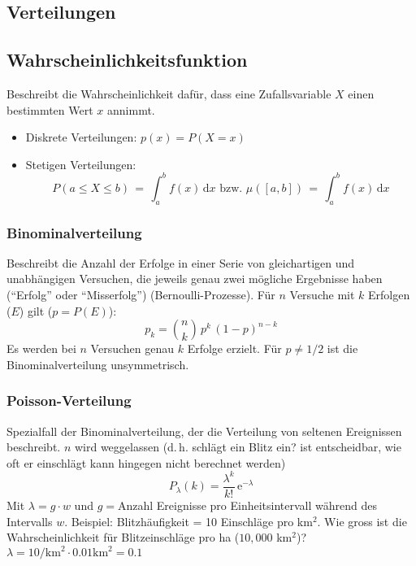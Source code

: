 \subsection{Verteilungen}

\subsection{Wahrscheinlichkeitsfunktion}
Beschreibt die Wahrscheinlichkeit dafür, dass eine Zufallsvariable $X$ einen bestimmten Wert $x$ annimmt.
\begin{itemize}\itemsep0em
	\item Diskrete Verteilungen: $p(x) = P(X = x)$
	\item Stetigen Verteilungen: 
	\begin{equation*}
	P(a \le X \le b) \, = \, \int_a^b f(x)\,\mathrm dx \mbox{ bzw. } \mu([a,b]) \, = \, \int_a^b f(x)\,\mathrm dx	
	\end{equation*}
\end{itemize}


\subsubsection{Binominalverteilung}
Beschreibt die Anzahl der Erfolge in einer Serie von gleichartigen und unabhängigen Versuchen, die jeweils genau zwei mögliche Ergebnisse haben (\enquote{Erfolg} oder \enquote{Misserfolg}) (Bernoulli-Prozesse). Für $n$ Versuche mit $k$ Erfolgen ($E$) gilt ($p = P(E)$):
\begin{equation*}
	p_k = \binom {n}{k}\, p^k\, (1-p)^{n-k}
\end{equation*}
Es werden bei $n$ Versuchen genau $k$ Erfolge erzielt. Für $p \neq 1/2$ ist die Binominalverteilung unsymmetrisch.

\subsubsection{Poisson-Verteilung}
Spezialfall der Binominalverteilung, der die Verteilung von seltenen Ereignissen beschreibt. $n$ wird weggelassen (d.\,h. schlägt ein Blitz ein? ist entscheidbar, wie oft er einschlägt kann hingegen nicht berechnet werden)
\begin{equation*}
	P_\lambda (k) = \frac{\lambda^k}{k!}\, \mathrm{e}^{-\lambda}
\end{equation*}
Mit $\lambda = g \cdot w$ und $g = $Anzahl Ereignisse pro Einheitsintervall während des Intervalls $w$. Beispiel: Blitzhäufigkeit = 10 Einschläge pro km$^2$. Wie gross ist die Wahrscheinlichkeit für Blitzeinschläge pro ha ($10{,}000$ km$^2$)?
$\lambda = 10/\mbox{km}^2 \cdot 0.01 \mbox{km}^2 = 0.1$


